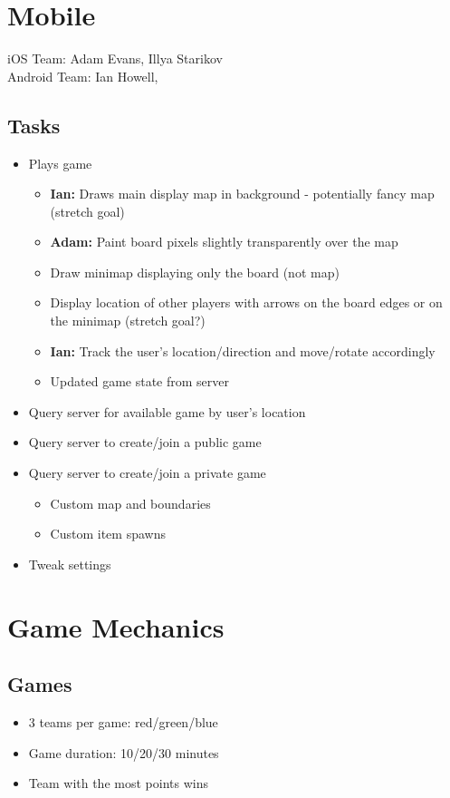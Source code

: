 \documentclass{article}
\begin{document}
\newpage
\section{Mobile}
iOS Team: Adam Evans, Illya Starikov\\
Android Team: Ian Howell,
\subsection{Tasks}
\begin{itemize}
  \item Plays game
    \begin{itemize}
      \item \textbf{Ian:} Draws main display map in background - potentially fancy map (stretch goal)
      \item \textbf{Adam:} Paint board pixels slightly transparently over the map
      \item Draw minimap displaying only the board (not map)
      \item Display location of other players with arrows on the board edges or on the minimap (stretch goal?)
      \item \textbf{Ian:} Track the user's location/direction and move/rotate accordingly
      \item Updated game state from server
    \end{itemize}
  \item Query server for available game by user's location
  \item Query server to create/join a public game
  \item Query server to create/join a private game
    \begin{itemize}
      \item Custom map and boundaries
      \item Custom item spawns
    \end{itemize}
  \item Tweak settings
\end{itemize}

\newpage
\section{Game Mechanics}

\subsection{Games}
\begin{itemize}
\item 3 teams per game: red/green/blue
\item Game duration: 10/20/30 minutes
\item Team with the most points wins
\end{itemize}
\end{document}
